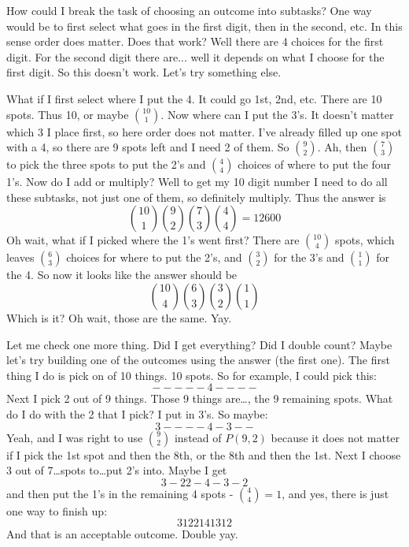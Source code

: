 \documentclass[11pt]{exam}
\begin{document}
\begin{questions}
\begin{solution}
How could I break the task of choosing an outcome into subtasks?  One way would be to first select what goes in the first digit, then in the second, etc.  In this sense order does matter.  Does that work?  Well there are 4 choices for the first digit.  For the second digit there are... well it depends on what I choose for the first digit.  So this doesn't work.  Let's try something else.

What if I first select where I put the 4.  It could go 1st, 2nd, etc.  There are 10 spots.  Thus 10, or maybe ${10 \choose 1}$.  Now where can I put the 3's.  It doesn't matter which 3 I place first, so here order does not matter.  I've already filled up one spot with a 4, so there are 9 spots left and I need 2 of them.  So ${9 \choose 2}$.  Ah, then ${7 \choose 3}$ to pick the three spots to put the 2's and ${4 \choose 4}$ choices of where to put the four 1's.  Now do I add or multiply?  Well to get my 10 digit number I need to do all these subtasks, not just one of them, so definitely multiply.  Thus the answer is
\[{10 \choose 1}{9 \choose 2}{7 \choose 3}{4 \choose 4} = 12600\]
Oh wait, what if I picked where the 1's went first?  There are ${10 \choose 4}$ spots, which leaves ${6 \choose 3}$ choices for where to put the 2's, and ${3 \choose 2}$ for the 3's and ${1 \choose 1}$ for the 4.  So now it looks like the answer should be
\[{10 \choose 4}{6 \choose 3}{3 \choose 2}{1 \choose 1}\]
Which is it?  Oh wait, those are the same.  Yay.

Let me check one more thing.  Did I get everything?  Did I double count?  Maybe let's try building one of the outcomes using the answer (the first one).  The first thing I do is pick on of 10 things.  10 spots.  So for example, I could pick this:
\[- - - - - ~ 4 - - - -\]
Next I pick 2 out of 9 things.  Those 9 things are\ldots, the 9 remaining spots.  What do I do with the 2 that I pick?  I put in 3's.  So maybe:
\[3 - - - - ~ 4 - 3 - -\]
Yeah, and I was right to use ${9 \choose 2}$ instead of $P(9,2)$ because it does not matter if I pick the 1st spot and then the 8th, or the 8th and then the 1st.  Next I choose 3 out of 7\ldots spots to\ldots put 2's into.  Maybe I get
\[3 - 2 2 - 4 - 3 - 2\]
and then put the 1's in the remaining 4 spots - ${4 \choose 4} = 1$, and yes, there is just one way to finish up:
\[3 1 22141312\]
And that is an acceptable outcome.  Double yay.
\end{solution}

\end{questions}
\end{document}
